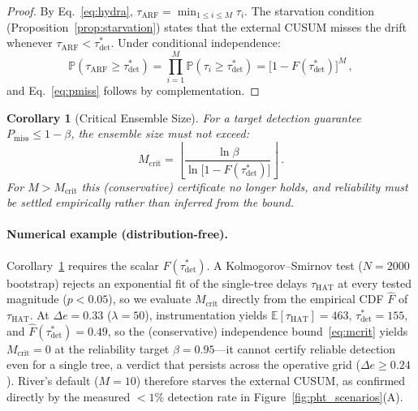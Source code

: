 \documentclass[10pt,conference]{IEEEtran}
\newtheorem{corollary}[theorem]{Corollary}
\theoremstyle{definition}
\begin{document}
\begin{proof}
  By Eq.~\eqref{eq:hydra}, $\tau_{\mathrm{ARF}} = \min_{1 \le i \le M} \tau_i$.
  The starvation condition (Proposition~\ref{prop:starvation}) states that the external CUSUM misses the drift whenever $\tau_{\mathrm{ARF}} < \tau_{\mathrm{det}}^*$.
  Under conditional independence:
  \[
    \mathbb{P}\!\left(\tau_{\mathrm{ARF}} \ge \tau_{\mathrm{det}}^*\right) = \prod_{i=1}^{M} \mathbb{P}\!\left(\tau_i \ge \tau_{\mathrm{det}}^*\right) = \bigl[1 - F(\tau_{\mathrm{det}}^*)\bigr]^M\,,
  \]
  and Eq.~\eqref{eq:pmiss} follows by complementation.
\end{proof}

\begin{corollary}[Critical Ensemble Size]\label{cor:mcrit}
  For a target detection guarantee $P_{\mathrm{miss}} \le 1 - \beta$, the ensemble size must not exceed:
  \begin{equation}\label{eq:mcrit}
    M_{\mathrm{crit}} = \left\lfloor \frac{\ln \beta}{\ln\!\bigl[1 - F(\tau_{\mathrm{det}}^*)\bigr]} \right\rfloor\,.
  \end{equation}
  For $M > M_{\mathrm{crit}}$ this (conservative) certificate no longer holds, and reliability must be settled empirically rather than inferred from the bound.
\end{corollary}

\paragraph{Numerical example (distribution-free).}
Corollary~\ref{cor:mcrit} requires the scalar $F(\tau_{\mathrm{det}}^*)$. A Kolmogorov--Smirnov test ($N{=}2000$ bootstrap) rejects an exponential fit of the single-tree delays $\tau_{\mathrm{HAT}}$ at every tested magnitude ($p<0.05$), so we evaluate $M_{\mathrm{crit}}$ directly from the empirical CDF $\widehat{F}$ of $\tau_{\mathrm{HAT}}$.
At $\Delta e = 0.33$ ($\lambda=50$), instrumentation yields $\mathbb{E}[\tau_{\mathrm{HAT}}] = 463$, $\tau_{\mathrm{det}}^* = 155$, and $\widehat{F}(\tau_{\mathrm{det}}^*) = 0.49$, so the (conservative) independence bound~\eqref{eq:mcrit} yields $M_{\mathrm{crit}} = 0$ at the reliability target $\beta = 0.95$---it cannot certify reliable detection even for a single tree, a verdict that persists across the operative grid ($\Delta e \ge 0.24$).
River's default ($M=10$) therefore starves the external CUSUM, as confirmed directly by the measured ${<}1\%$ detection rate in Figure~\ref{fig:pht_scenarios}(A).
\end{document}
